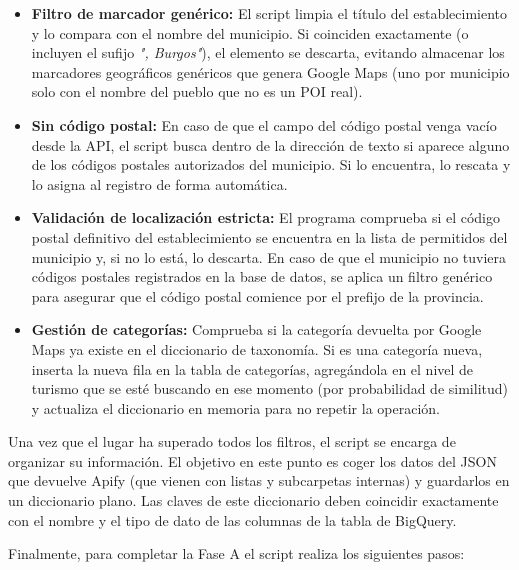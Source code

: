 \begin{itemize}
    \item \textbf{Filtro de marcador genérico:} El script limpia el título del establecimiento y lo compara con el nombre del municipio. Si coinciden exactamente (o incluyen el sufijo \textit{", Burgos"}), el elemento se descarta, evitando almacenar los marcadores geográficos genéricos que genera Google Maps (uno por municipio solo con el nombre del pueblo que no es un POI real).
    \item \textbf{Sin código postal:} En caso de que el campo del código postal venga vacío desde la API, el script busca dentro de la dirección de texto si aparece alguno de los códigos postales autorizados del municipio. Si lo encuentra, lo rescata y lo asigna al registro de forma automática.
    \item \textbf{Validación de localización estricta:} El programa comprueba si el código postal definitivo del establecimiento se encuentra en la lista de permitidos del municipio y, si no lo está, lo descarta. En caso de que el municipio no tuviera códigos postales registrados en la base de datos, se aplica un filtro genérico para asegurar que el código postal comience por el prefijo de la provincia.
    \item \textbf{Gestión de categorías:} Comprueba si la categoría devuelta por Google Maps ya existe en el diccionario de taxonomía. Si es una categoría nueva, inserta la nueva fila en la tabla de categorías, agregándola en el nivel de turismo que se esté buscando en ese momento (por probabilidad de similitud) y actualiza el diccionario en memoria para no repetir la operación.
\end{itemize}

Una vez que el lugar ha superado todos los filtros, el script se encarga de organizar su información. El objetivo en este punto es coger los datos del JSON que devuelve Apify (que vienen con listas y subcarpetas internas) y guardarlos en un diccionario plano. Las claves de este diccionario deben coincidir exactamente con el nombre y el tipo de dato de las columnas de la tabla de BigQuery.

Finalmente, para completar la Fase A el script realiza los siguientes pasos:

